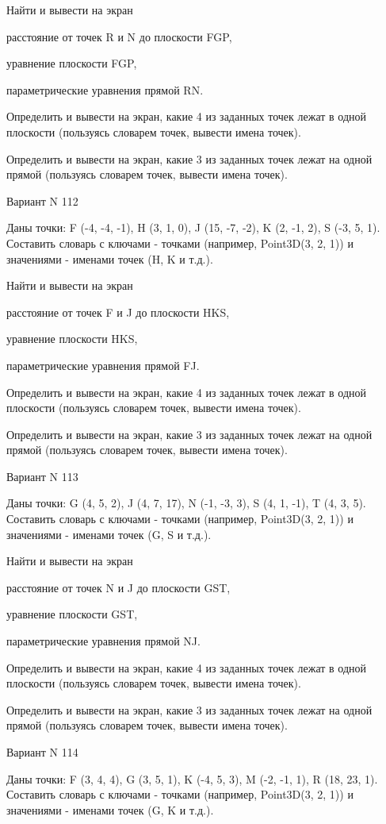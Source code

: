 \documentclass[11pt]{report}
\begin{document}
 
Найти и вывести на экран


расстояние от точек R и N до плоскости FGP,

 
уравнение плоскости FGP,

 
параметрические уравнения прямой RN.


Определить и вывести на экран, какие 4 из заданных точек лежат в одной плоскости (пользуясь словарем точек, вывести имена точек).


Определить и вывести на экран, какие 3 из заданных точек лежат на одной прямой (пользуясь словарем точек, вывести имена точек).

Вариант N 112

Даны точки: F (-4, -4, -1), H (3, 1, 0), J (15, -7, -2), K (2, -1, 2), S (-3, 5, 1).
Составить словарь с ключами - точками (например, Point3D(3, 2, 1)) и значениями - именами точек (H, K и т.д.).

 
Найти и вывести на экран


расстояние от точек F и J до плоскости HKS,

 
уравнение плоскости HKS,

 
параметрические уравнения прямой FJ.


Определить и вывести на экран, какие 4 из заданных точек лежат в одной плоскости (пользуясь словарем точек, вывести имена точек).


Определить и вывести на экран, какие 3 из заданных точек лежат на одной прямой (пользуясь словарем точек, вывести имена точек).

Вариант N 113

Даны точки: G (4, 5, 2), J (4, 7, 17), N (-1, -3, 3), S (4, 1, -1), T (4, 3, 5).
Составить словарь с ключами - точками (например, Point3D(3, 2, 1)) и значениями - именами точек (G, S и т.д.).

 
Найти и вывести на экран


расстояние от точек N и J до плоскости GST,

 
уравнение плоскости GST,

 
параметрические уравнения прямой NJ.


Определить и вывести на экран, какие 4 из заданных точек лежат в одной плоскости (пользуясь словарем точек, вывести имена точек).


Определить и вывести на экран, какие 3 из заданных точек лежат на одной прямой (пользуясь словарем точек, вывести имена точек).

Вариант N 114

Даны точки: F (3, 4, 4), G (3, 5, 1), K (-4, 5, 3), M (-2, -1, 1), R (18, 23, 1).
Составить словарь с ключами - точками (например, Point3D(3, 2, 1)) и значениями - именами точек (G, K и т.д.).
\end{document}
